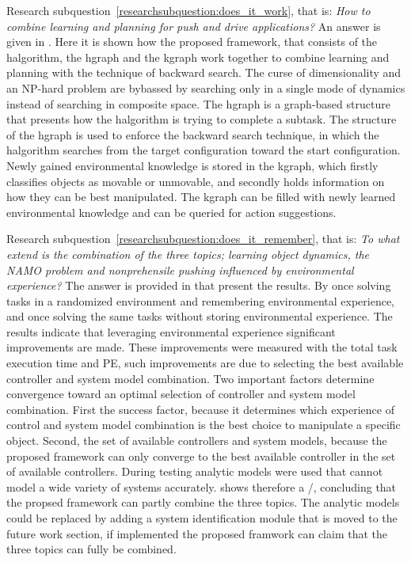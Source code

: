 Research subquestion~\ref{researchsubquestion:does_it_work}, that is: \textit{How to combine learning and planning for push and drive applications?} An answer is given in . Here it is shown how the proposed framework, that consists of the \acl{halgorithm}, the \acl{hgraph} and the \acl{kgraph} work together to combine learning and planning with the technique of backward search. The curse of dimensionality and an \ac{NP-hard} problem are bybassed by searching only in a single mode of dynamics instead of searching in composite space. The \ac{hgraph} is a graph-based structure that presents how the \ac{halgorithm} is trying to complete a subtask. The structure of the \ac{hgraph} is used to enforce the backward search technique, in which the \ac{halgorithm} searches from the target configuration toward the start configuration. Newly gained environmental knowledge is stored in the \ac{kgraph}, which firstly classifies objects as movable or unmovable, and secondly holds information on how they can be best manipulated. The \ac{kgraph} can be filled with newly learned environmental knowledge and can be queried for action suggestions.\bs

Research subquestion~\ref{researchsubquestion:does_it_remember}, that is: \textit{
To what extend is the combination of the three topics; learning object dynamics, the \ac{NAMO} problem and nonprehensile pushing influenced by environmental experience?} The answer is provided in  that present the results. By once solving tasks in a randomized environment and remembering environmental experience, and once solving the same tasks without storing environmental experience. The results indicate that leveraging environmental experience significant improvements are made. These improvements were measured with the total task execution time and \acl{PE}, such improvements are due to selecting the best available controller and system model combination. Two important factors determine convergence toward an optimal selection of controller and system model combination. First the success factor, because it determines which experience of control and system model combination is the best choice to manipulate a specific object. Second, the set of available controllers and system models, because the proposed framework can only converge to the best available controller in the set of available controllers. During testing analytic models were used that cannot model a wide variety of systems accurately.  shows therefore a \xmark/\cmark, concluding that the propsed framework can partly combine the three topics. The analytic models could be replaced by adding a system identification module that is moved to the future work section, if implemented the proposed framwork can claim that the three topics can fully be combined.\bs

